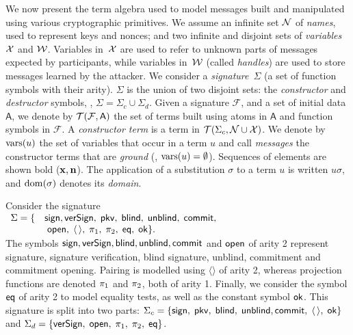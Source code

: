 \label{sec:app:model}
\label{subsec:term}
We now present the term algebra used to model messages
built and manipulated using various cryptographic primitives.
We assume an infinite set $\mathcal{N}$ of \emph{names}, used to represent
keys and nonces; and two infinite and disjoint sets of \emph{variables}
$\mathcal{X}$ and $\mathcal{W}$. Variables in~$\mathcal{X}$ are used to
refer to unknown parts of messages expected by participants,
while variables in~$\mathcal{W}$ (called {\em handles})
are used to store messages learned by the 
attacker.
%
We consider a \emph{signature}~$\Sigma$ (\ie a set of function
symbols with their arity). $\Sigma$ is the union
of two disjoint sets:
the \emph{constructor} and \emph{destructor} symbols, \ie, $\Sigma =
\Sigma_c \cup \Sigma_d$.
%
Given a signature $\mathcal{F}$, and a set of initial data
$\mathsf{A}$, we denote by $\mathcal{T}(\mathcal{F},\mathsf{A})$ the set of terms built
using atoms in $\mathsf{A}$ and function symbols in $\mathcal{F}$.
A {\em constructor term} is a term in $\mathcal{T}(\Sigma_c, \mathcal{N} \cup \mathcal{X})$.
We denote by ${\mathrm{vars}}(u)$ the set of variables that occur in a term $u$
and call \emph{messages} the constructor terms that are \emph{ground} (\ie, ${\mathrm{vars}}(u) = \emptyset$).
Sequences of elements are shown bold (\eg ${\mathbf{x}},{\mathbf{n}}$).
The application of a substitution $\sigma$ to a term $u$ is written
$u\sigma$, and $\mathrm{dom}(\sigma)$ denotes its \emph{domain}.


\begin{example}
\label{ex:app:signature}
Consider the signature\\[1mm]
\null\hfill
$\begin{array}{rl}
   \Sigma = \{&\mathsf{sign},\mathsf{verSign},\;\mathsf{pkv},\; \mathsf{blind},\;\mathsf{unblind},\;\mathsf{commit},\\
              &\;\mathsf{open},\;\langle \, \rangle, \;
              \pi_1, \; \pi_2, \; \mathsf{eq}, \;\mathsf{ok}\}.
 \end{array}$
\hfill\null\\[1mm]
The symbols $\mathsf{sign},\mathsf{verSign},\mathsf{blind},\mathsf{unblind},\mathsf{commit}$ and $\mathsf{open}$ of
arity 2 represent signature, signature verification, blind signature, unblind, commitment and
commitment opening. Pairing is modelled using $\langle \rangle$ of arity 2, whereas projection
functions are denoted $\pi_1$ and $\pi_2$, both of arity 1.
Finally, we consider the symbol $\mathsf{eq}$ of arity 2 to model
equality tests, as well as the constant symbol $\mathsf{ok}$. This signature is
split into two parts:
$
\Sigma_c = \{\mathsf{sign},\;\mathsf{pkv},\;\mathsf{blind},\;\mathsf{unblind},\mathsf{commit},\;\langle \, \rangle, \;\mathsf{ok}\}$ and
$\Sigma_d = \{\mathsf{verSign},\;\mathsf{open},\;\pi_1, \; \pi_2, \; \mathsf{eq}\}$.
\end{example}


